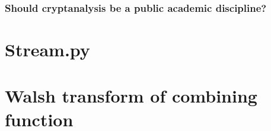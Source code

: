 \documentclass[british,11pt,a4paper]{article}
\begin{document}
\subsubsection{Should cryptanalysis be a public academic discipline?}

\clearpage
\begin{appendices}
  \section{Stream.py}\label{app:stream}
  

  \section{Walsh transform of combining function}\label{app:walsh}
  

\end{appendices}
\clearpage


\end{document}
